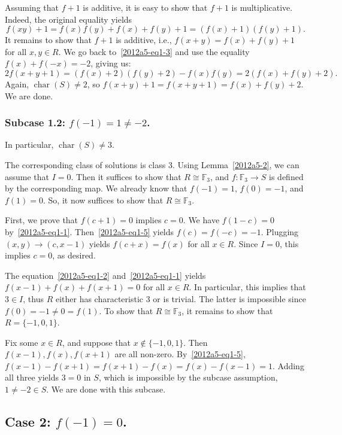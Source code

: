 \documentclass{article}
\newcommand{\F}{\mathbb{F}}
\DeclareMathOperator{\rchar}{char}
\begin{document}
Assuming that $f + 1$ is additive, it is easy to show that $f + 1$ is multiplicative.
Indeed, the original equality yields
\[ f(xy) + 1 = f(x) f(y) + f(x) + f(y) + 1 = (f(x) + 1)(f(y) + 1). \]
It remains to show that $f + 1$ is additive, i.e., $f(x + y) = f(x) + f(y) + 1$ for all $x, y \in R$.
We go back to~\eqref{2012a5-eq1-3} and use the equality $f(x) + f(-x) = -2$, giving us:
\[ 2 f(x + y + 1) = (f(x) + 2) (f(y) + 2) - f(x) f(y) = 2 (f(x) + f(y) + 2). \]
Again, $\rchar(S) \neq 2$, so $f(x + y) + 1 = f(x + y + 1) = f(x) + f(y) + 2$.
We are done.


\subsubsection*{Subcase 1.2: $f(-1) = 1 \neq -2$.}

In particular, $\rchar(S) \neq 3$.

The corresponding class of solutions is class 3.
Using Lemma~\ref{2012a5-2}, we can assume that $I = 0$.
Then it suffices to show that $R \cong \F_3$, and $f : \F_3 \to S$ is defined by the corresponding map.
We already know that $f(-1) = 1$, $f(0) = -1$, and $f(1) = 0$.
So, it now suffices to show that $R \cong \F_3$.

First, we prove that $f(c + 1) = 0$ implies $c = 0$.
We have $f(1 - c) = 0$ by~\eqref{2012a5-eq1-1}.
Then~\eqref{2012a5-eq1-5} yields $f(c) = f(-c) = -1$.
Plugging $(x, y) \to (c, x - 1)$ yields $f(c + x) = f(x)$ for all $x \in R$.
Since $I = 0$, this implies $c = 0$, as desired.

The equation~\eqref{2012a5-eq1-2} and~\eqref{2012a5-eq1-1} yields $f(x - 1) + f(x) + f(x + 1) = 0$ for all $x \in R$.
In particular, this implies that $3 \in I$, thus $R$ either has characteristic $3$ or is trivial.
The latter is impossible since $f(0) = -1 \neq 0 = f(1)$.
To show that $R \cong \F_3$, it remains to show that $R = \{-1, 0, 1\}$.

Fix some $x \in R$, and suppose that $x \notin \{-1, 0, 1\}$.
Then $f(x - 1), f(x), f(x + 1)$ are all non-zero.
By~\eqref{2012a5-eq1-5}, $f(x - 1) - f(x + 1) = f(x + 1) - f(x) = f(x) - f(x - 1) = 1$.
Adding all three yields $3 = 0$ in $S$, which is impossible by the subcase assumption, $1 \neq -2 \in S$.
We are done with this subcase.



\newpage

\subsection*{Case 2: $f(-1) = 0$.}
\end{document}

